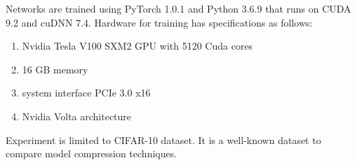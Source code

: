     Networks are trained using PyTorch 1.0.1 and Python 3.6.9 that runs on CUDA 9.2 and cuDNN 7.4. Hardware for training has specifications as follows:
    \begin{enumerate}
    	\item Nvidia Tesla V100 SXM2 GPU with 5120 Cuda cores
    	\item 16 GB memory
    	\item system interface PCIe 3.0 x16 
    	\item Nvidia Volta architecture 
    \end{enumerate}
    
    Experiment is limited to CIFAR-10 \cite{Krizhevsky09learningmultiple} dataset. It is a well-known dataset to compare model compression techniques. 

